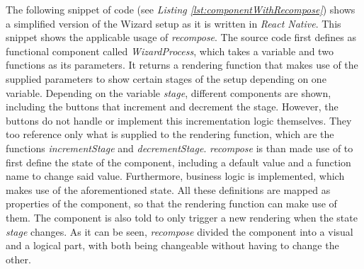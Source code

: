 The following snippet of code (see \textit{Listing \ref{lst:componentWithRecompose}}) shows a simplified version of the Wizard setup as it is written in \textit{React Native}. This snippet shows the applicable usage of \textit{recompose}. The source code first defines as functional component called \textit{WizardProcess}, which takes a variable and two functions as its parameters. It returns a rendering function that makes use of the supplied parameters to show certain stages of the setup depending on one variable. Depending on the variable \textit{stage}, different components are shown, including the buttons that increment and decrement the stage. However, the buttons do not handle or implement this incrementation logic themselves. They too reference only what is supplied to the rendering function, which are the functions \textit{incrementStage} and \textit{decrementStage}. \textit{recompose} is than made use of to first define the state of the component, including a default value and a function name to change said value. Furthermore, business logic is implemented, which makes use of the aforementioned state. All these definitions are mapped as properties of the component, so that the rendering function can make use of them. The component is also told to only trigger a new rendering when the state \textit{stage} changes. As it can be seen, \textit{recompose} divided the component into a visual and a logical part, with both being changeable without having to change the other. 

